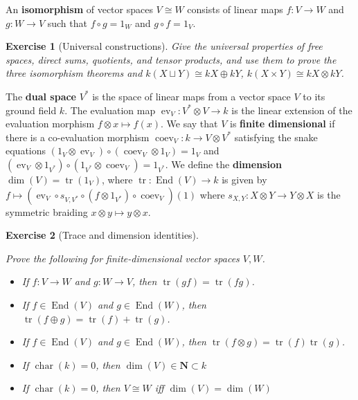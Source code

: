 \documentclass{article}
\newtheorem{exercise}{Exercise}
\newcommand{\trace}{\operatorname{tr}}
\newcommand{\ev}{\operatorname{ev}}
\newcommand{\coev}{\operatorname{coev}}
\newcommand{\End}{\operatorname{End}}
\begin{document}
An \textbf{isomorphism} of vector spaces $V\cong W$ consists of linear maps $f:V\to W$ and $g:W\to V$ such that $f\circ g=1_W$ and $g\circ f=1_V$.

\begin{exercise}[Universal constructions]\leavevmode\par
Give the universal properties of free spaces, direct sums, quotients, and
tensor products, and use them to prove the three isomorphism theorems and
$k(X\sqcup Y)\cong kX\oplus kY$, $k(X\times Y)\cong kX\otimes kY$.
\end{exercise}

The \textbf{dual space} $V^*$ is the space of linear maps from a vector space $V$ to its ground field $k$. The evaluation map $\ev_V : V^* \otimes V \to k$ is the linear extension of the evaluation morphism $f \otimes x \mapsto f(x)$. We say that $V$ is \textbf{finite dimensional} if there is a co-evaluation morphism $\coev_V: k \to V \otimes V^*$ satisfying the snake equations $(1_{V} \otimes \ev_V) \circ (\coev_V \otimes 1_V) = 1_V$
and
$(\ev_V \otimes 1_{V^*}) \circ (1_{V^*} \otimes \coev_{V}) = 1_{V^*}$. We define the \textbf{dimension} $\dim(V) = \trace(1_V)$, where $\trace : \End(V) \to k$ is given by $f \mapsto (\ev_V \circ s_{V, V^*} \circ (f \otimes 1_{V^*}) \circ \coev_V)(1)$ where $s_{X, Y} : X \otimes Y \to Y \otimes X$ is the symmetric braiding $x \otimes y \mapsto y \otimes x$.



\begin{exercise}[Trace and dimension identities]\label{ex:linear-trace-dimension}\leavevmode\par
Prove the following for finite-dimensional vector spaces $V,W$.
    \begin{itemize}
        \item If $f:V\to W$ and $g:W\to V$, then
        $\trace(gf)=\trace(fg)$.
        \item If $f\in\End(V)$ and $g\in\End(W)$, then
        $\trace(f \oplus g) = \trace(f) + \trace(g)$.
        \item If $f\in\End(V)$ and $g\in\End(W)$, then
        $\trace(f \otimes g) = \trace(f) \trace(g)$.
        \item If $\operatorname{char}(k)=0$, then $\dim(V)\in\mathbf{N}\subset k$
        \item If $\operatorname{char}(k)=0$, then $V\cong W$ iff $\dim(V)=\dim(W)$
    \end{itemize}
\end{exercise}
\end{document}
